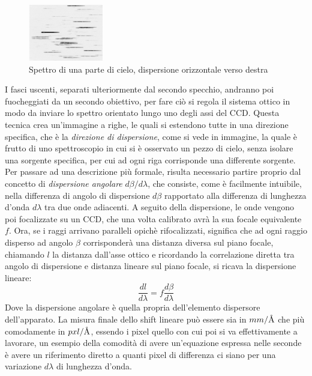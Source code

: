 \begin{figure}
    \centering
    \vspace{-10pt}
    \includegraphics[width=0.29\textwidth]{Immagini/Capitolo3/Spettro_cielo_generico.PNG}
    \caption*{Spettro di una parte di cielo, dispersione orizzontale verso destra}
    \vspace{-15pt}
\end{figure}

I fasci uscenti, separati ulteriormente dal secondo specchio, andranno poi fuocheggiati da un secondo obiettivo, per fare ciò si regola il sistema ottico in modo da inviare lo spettro orientato lungo uno degli assi del CCD. Questa tecnica crea un'immagine a righe, le quali si estendono tutte in una direzione specifica, che è la \textit{direzione di dispersione}, come si vede in immagine, la quale è frutto di uno spettroscopio in cui si è osservato un pezzo di cielo, senza isolare una sorgente specifica, per cui ad ogni riga corrisponde una differente sorgente. Per passare ad una descrizione più formale, risulta necessario partire proprio dal concetto di \textit{dispersione angolare} $d\beta/d\lambda$, che consiste, come è facilmente intuibile, nella differenza di angolo di dispersione $d\beta$ rapportato alla differenza di lunghezza d'onda $d\lambda$ tra due onde adiacenti. A seguito della dispersione, le onde vengono poi focalizzate su un CCD, che una volta calibrato avrà la sua focale equivalente $f$. Ora, se i raggi arrivano paralleli opichè rifocalizzati, significa che ad ogni raggio disperso ad angolo $\beta$ corrisponderà una distanza diversa sul piano focale, chiamando $l$ la distanza dall'asse ottico e ricordando la correlazione diretta tra angolo di dispersione e distanza lineare sul piano focale, si ricava la dispersione lineare:
\begin{equation}
    \frac{dl}{d\lambda} = f \frac{d\beta}{d\lambda}
\end{equation}
Dove la dispersione angolare è quella propria dell'elemento dispersore dell'apparato. La misura finale dello shift lineare può essere sia in $mm/\mbox{\normalfont\AA}$ che più comodamente in $pxl/\mbox{\normalfont\AA}$, essendo i pixel quello con cui poi si va effettivamente a lavorare, un esempio della comodità di avere un'equazione espressa nelle seconde è avere un riferimento diretto a quanti pixel di differenza ci siano per una variazione $d\lambda$ di lunghezza d'onda.


